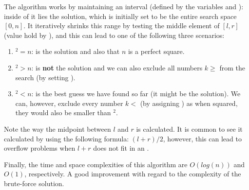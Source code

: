 

The algorithm works by maintaining an interval (defined by the variables  and ): inside of it lies the solution,  which is initially set to be the entire search space $[0,n]$.
It iteratively shrinks this range by testing the middle element of $[l,r]$ (value hold by ), and this can lead to one of the following three scenarios:

 \begin{enumerate}
	 \item {}$^2  = n$:  is the solution and also that $n$ is a perfect square.
	 \item {}$^2 > n$:  is \textbf{not} the solution and we can also exclude
	 all numbers $k \geq $  from the search (by setting ).
	 \item {}$^2  < n$:  is the best guess we have found so far (it might be the solution). We can, however, exclude every number $k <$ (by assigning ) as when squared, they would also be smaller than $^2$.
 \end{enumerate}

Note the way the midpoint between $l$ and $r$ is calculated. 
 It is common to see it calculated by using the following formula: $(l+r)/2$,
 however, this can lead to overflow problems when $l+r$ does not fit in an .

Finally, the time and space complexities of this algorithm are $O(log(n))$ and $O(1)$, respectively. A good improvement with regard to the complexity of the brute-force solution.
